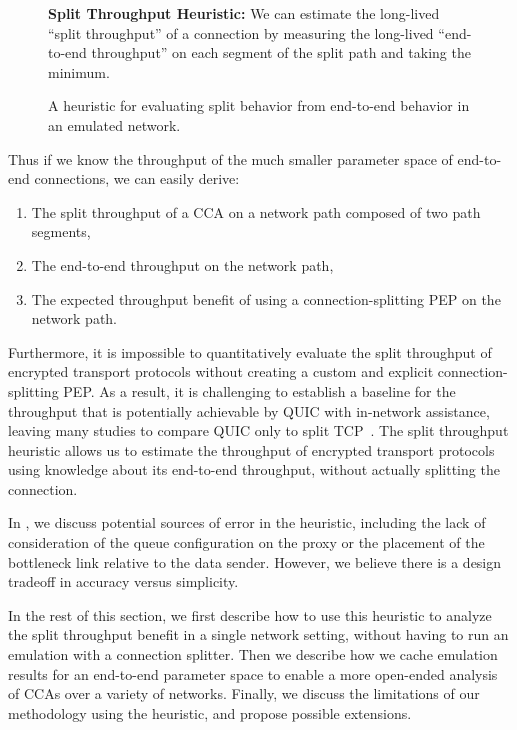 \begin{figure}[h]
  \centering
  \begin{tcolorbox}[colback=yellow!20, width=\linewidth, sharp corners]
    \textbf{Split Throughput Heuristic:} We can estimate the long-lived ``split
     throughput'' of a connection by measuring the long-lived ``end-to-end
     throughput'' on each segment of the split path and taking the minimum.
  \end{tcolorbox}
  \caption{A heuristic for evaluating split behavior from end-to-end behavior in
   an emulated network.}
  \label{fig:heuristic}
\end{figure}

\noindent Thus if we know the throughput of the much smaller parameter
 space of end-to-end connections, we can easily derive:

\begin{enumerate}[noitemsep]
    \item The split throughput of a CCA on a network path composed of two path
     segments,
    \item The end-to-end throughput on the network path,
    \item The expected throughput benefit of using a connection-splitting PEP
     on the network path.
\end{enumerate}

Furthermore, it is impossible to quantitatively evaluate the split throughput
of encrypted transport protocols without creating a custom and explicit
connection-splitting PEP. As a result, it is challenging to establish a
baseline for the throughput that is potentially achievable by QUIC with
in-network assistance, leaving many studies to compare QUIC only to split TCP~\cite
{thomas2019google,border2020evaluating,yuan2024sidekick}. The split throughput
heuristic allows us to estimate the throughput of encrypted transport
protocols using knowledge about its end-to-end throughput, without
actually splitting the connection.

In , we discuss potential sources of error in the heuristic,
including the lack of consideration of the queue configuration on the proxy
or the placement of the bottleneck link relative to the data sender. However,
we believe there is a design tradeoff in accuracy versus simplicity.

In the rest of this section, we first describe how to use this heuristic to
analyze the split throughput benefit in a single network setting, without
having to run an emulation with a connection splitter. Then we describe how we
cache emulation results for an end-to-end parameter space to enable a more
open-ended analysis of CCAs over a variety of networks. Finally, we discuss the
limitations of our methodology using the heuristic, and propose possible
extensions.

